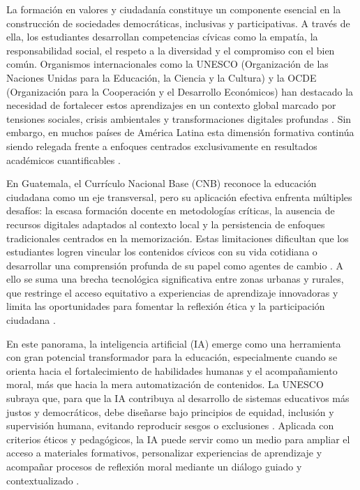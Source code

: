 La formación en valores y ciudadanía constituye un componente esencial en la
construcción de sociedades democráticas, inclusivas y participativas. A través
de ella, los estudiantes desarrollan competencias cívicas como la empatía, la
responsabilidad social, el respeto a la diversidad y el compromiso con el bien
común. Organismos internacionales como la UNESCO (Organización de las Naciones
Unidas para la Educación, la Ciencia y la Cultura) y la OCDE (Organización para
la Cooperación y el Desarrollo Económicos) han destacado la necesidad de
fortalecer estos aprendizajes en un contexto global marcado por tensiones
sociales, crisis ambientales y transformaciones digitales profundas
\cite{unesco2021ethics,oecd2021skills}. Sin embargo, en muchos países de
América Latina esta dimensión formativa continúa siendo relegada frente a
enfoques centrados exclusivamente en resultados académicos cuantificables
\cite{worldbank2022revolution,rivas2023future}.

En Guatemala, el Currículo Nacional Base (CNB) reconoce la educación ciudadana
como un eje transversal, pero su aplicación efectiva enfrenta múltiples
desafíos: la escasa formación docente en metodologías críticas, la ausencia de
recursos digitales adaptados al contexto local y la persistencia de enfoques
tradicionales centrados en la memorización. Estas limitaciones dificultan que
los estudiantes logren vincular los contenidos cívicos con su vida cotidiana o
desarrollar una comprensión profunda de su papel como agentes de cambio
\cite{mineduc2020cnb,cien2019diagnostico}. A ello se suma una brecha
tecnológica significativa entre zonas urbanas y rurales, que restringe el
acceso equitativo a experiencias de aprendizaje innovadoras y limita las
oportunidades para fomentar la reflexión ética y la participación ciudadana
\cite{unesco2023monitoring,levy2025teachers}.

En este panorama, la inteligencia artificial (IA) emerge como una herramienta
con gran potencial transformador para la educación, especialmente cuando se
orienta hacia el fortalecimiento de habilidades humanas y el acompañamiento
moral, más que hacia la mera automatización de contenidos. La UNESCO subraya
que, para que la IA contribuya al desarrollo de sistemas educativos más justos
y democráticos, debe diseñarse bajo principios de equidad, inclusión y
supervisión humana, evitando reproducir sesgos o exclusiones
\cite{unesco2021ethics,unesco2021guidance}. Aplicada con criterios éticos y
pedagógicos, la IA puede servir como un medio para ampliar el acceso a
materiales formativos, personalizar experiencias de aprendizaje y acompañar
procesos de reflexión moral mediante un diálogo guiado y contextualizado
\cite{frontiers2024chatgpt,tulsiani2024chatgpt}.

